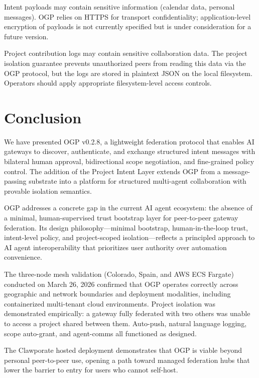 \documentclass[conference]{IEEEtran}
\begin{document}
Intent payloads may contain sensitive information (calendar data, personal messages). OGP relies on HTTPS for transport confidentiality; application-level encryption of payloads is not currently specified but is under consideration for a future version.

Project contribution logs may contain sensitive collaboration data. The project isolation guarantee prevents unauthorized peers from reading this data via the OGP protocol, but the logs are stored in plaintext JSON on the local filesystem. Operators should apply appropriate filesystem-level access controls.

\section{Conclusion}
\label{sec:conclusion}

We have presented OGP v0.2.8, a lightweight federation protocol that enables AI gateways to discover, authenticate, and exchange structured intent messages with bilateral human approval, bidirectional scope negotiation, and fine-grained policy control. The addition of the Project Intent Layer extends OGP from a message-passing substrate into a platform for structured multi-agent collaboration with provable isolation semantics.

OGP addresses a concrete gap in the current AI agent ecosystem: the absence of a minimal, human-supervised trust bootstrap layer for peer-to-peer gateway federation. Its design philosophy---minimal bootstrap, human-in-the-loop trust, intent-level policy, and project-scoped isolation---reflects a principled approach to AI agent interoperability that prioritizes user authority over automation convenience.

The three-node mesh validation (Colorado, Spain, and AWS ECS Fargate) conducted on March 26, 2026 confirmed that OGP operates correctly across geographic and network boundaries and deployment modalities, including containerized multi-tenant cloud environments. Project isolation was demonstrated empirically: a gateway fully federated with two others was unable to access a project shared between them. Auto-push, natural language logging, scope auto-grant, and agent-comms all functioned as designed.

The Clawporate hosted deployment demonstrates that OGP is viable beyond personal peer-to-peer use, opening a path toward managed federation hubs that lower the barrier to entry for users who cannot self-host.
\end{document}
